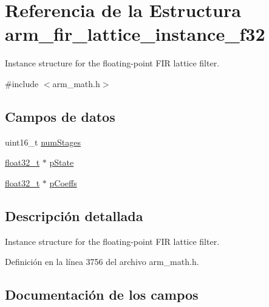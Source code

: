 \hypertarget{structarm__fir__lattice__instance__f32}{}\section{Referencia de la Estructura arm\+\_\+fir\+\_\+lattice\+\_\+instance\+\_\+f32}
\label{structarm__fir__lattice__instance__f32}


Instance structure for the floating-\/point F\+IR lattice filter.  




{\ttfamily \#include $<$arm\+\_\+math.\+h$>$}

\subsection*{Campos de datos}
\begin{DoxyCompactItemize}
\item 
uint16\+\_\+t \hyperlink{structarm__fir__lattice__instance__f32_a4cceb90547b3e585d4c7aabaa8057212}{num\+Stages}
\item 
\hyperlink{arm__math_8h_a4611b605e45ab401f02cab15c5e38715}{float32\+\_\+t} $\ast$ \hyperlink{structarm__fir__lattice__instance__f32_a335c87e6fdc4b96601d95a5de8b9c463}{p\+State}
\item 
\hyperlink{arm__math_8h_a4611b605e45ab401f02cab15c5e38715}{float32\+\_\+t} $\ast$ \hyperlink{structarm__fir__lattice__instance__f32_aacbb8dd8eeba4b21fc2bb40076405ee3}{p\+Coeffs}
\end{DoxyCompactItemize}


\subsection{Descripción detallada}
Instance structure for the floating-\/point F\+IR lattice filter. 

Definición en la línea 3756 del archivo arm\+\_\+math.\+h.



\subsection{Documentación de los campos}
